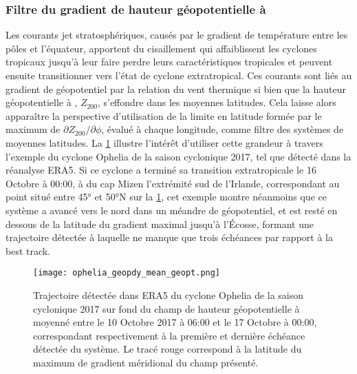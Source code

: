 \documentclass[../main.tex]{subfiles}
\begin{document}
\subsubsection*{Filtre du gradient de hauteur géopotentielle à }

Les courants jet stratosphériques, causés par le gradient de température entre les pôles et l'équateur, apportent du cisaillement qui affaiblissent les cyclones
tropicaux jusqu'à leur faire perdre leurs caractéristiques tropicales et peuvent ensuite transitionner vers l'état de cyclone extratropical. Ces courants sont
liés au gradient de géopotentiel par la relation du vent thermique si bien que la hauteur géopotentielle à , $Z_{200}$, s'effondre dans les moyennes
latitudes. Cela laisse alors apparaître la perspective d'utilisation de la limite en latitude formée par le maximum de $\partial Z_{200} / \partial \phi$, évalué à
chaque longitude, comme filtre des systèmes de moyennes latitudes. La \cref{fig:ophelia_z200} illustre l'intérêt d'utiliser cette grandeur à travers l'exemple
du cyclone Ophelia de la saison cyclonique 2017, tel que détecté dans la réanalyse ERA5. Si ce cyclone a terminé sa transition extratropicale le 16 Octobre à
00:00, à  du cap Mizen l'extrémité sud de l'Irlande, correspondant au point situé entre \ang{45} et \ang{50}N sur la \cref{fig:ophelia_z200}, cet
exemple montre néanmoins que ce système a avancé vers le nord dans un méandre de géopotentiel, et est resté en dessous de la latitude du gradient maximal
jusqu'à l'Écosse, formant une trajectoire détectée à laquelle ne manque que trois échéances par rapport à la best track.

\begin{figure}[htpb]
    \centering
    \texttt{[image: ophelia\_geopdy\_mean\_geopt.png]}
    \caption{Trajectoire détectée dans ERA5 du cyclone Ophelia de la saison cyclonique 2017 sur fond du champ de hauteur géopotentielle à  moyenné
    entre le 10 Octobre 2017 à 06:00 et le 17 Octobre à 00:00, correspondant respectivement à la première et dernière échéance détectée du système. Le tracé
    rouge correspond à la latitude du maximum de gradient méridional du champ présenté.}
    \label{fig:ophelia_z200}
\end{figure}
\end{document}
